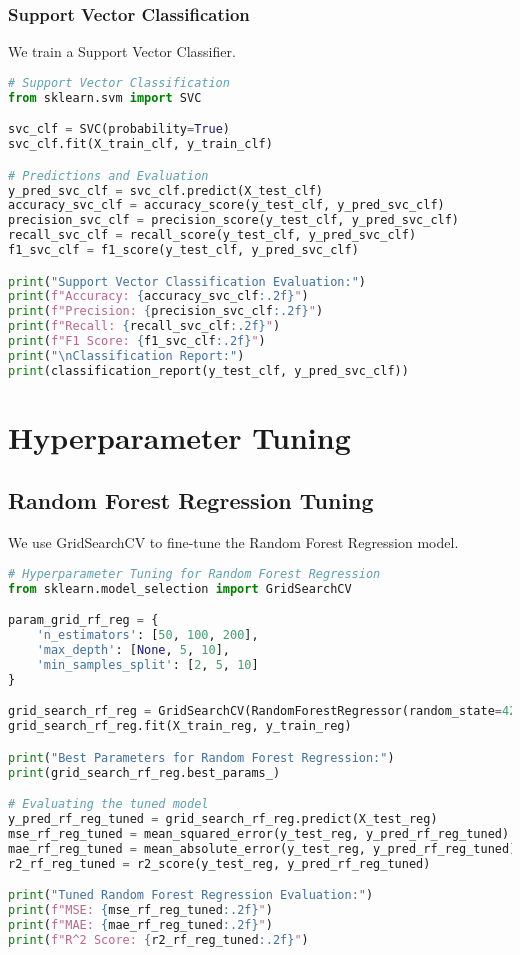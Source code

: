 \documentclass{article}
\begin{document}
\subsubsection{Support Vector Classification}

We train a Support Vector Classifier.

\begin{lstlisting}[language=Python]
# Support Vector Classification
from sklearn.svm import SVC

svc_clf = SVC(probability=True)
svc_clf.fit(X_train_clf, y_train_clf)

# Predictions and Evaluation
y_pred_svc_clf = svc_clf.predict(X_test_clf)
accuracy_svc_clf = accuracy_score(y_test_clf, y_pred_svc_clf)
precision_svc_clf = precision_score(y_test_clf, y_pred_svc_clf)
recall_svc_clf = recall_score(y_test_clf, y_pred_svc_clf)
f1_svc_clf = f1_score(y_test_clf, y_pred_svc_clf)

print("Support Vector Classification Evaluation:")
print(f"Accuracy: {accuracy_svc_clf:.2f}")
print(f"Precision: {precision_svc_clf:.2f}")
print(f"Recall: {recall_svc_clf:.2f}")
print(f"F1 Score: {f1_svc_clf:.2f}")
print("\nClassification Report:")
print(classification_report(y_test_clf, y_pred_svc_clf))
\end{lstlisting}

\section{Hyperparameter Tuning}

\subsection{Random Forest Regression Tuning}

We use GridSearchCV to fine-tune the Random Forest Regression model.

\begin{lstlisting}[language=Python]
# Hyperparameter Tuning for Random Forest Regression
from sklearn.model_selection import GridSearchCV

param_grid_rf_reg = {
    'n_estimators': [50, 100, 200],
    'max_depth': [None, 5, 10],
    'min_samples_split': [2, 5, 10]
}

grid_search_rf_reg = GridSearchCV(RandomForestRegressor(random_state=42), param_grid_rf_reg, cv=5)
grid_search_rf_reg.fit(X_train_reg, y_train_reg)

print("Best Parameters for Random Forest Regression:")
print(grid_search_rf_reg.best_params_)

# Evaluating the tuned model
y_pred_rf_reg_tuned = grid_search_rf_reg.predict(X_test_reg)
mse_rf_reg_tuned = mean_squared_error(y_test_reg, y_pred_rf_reg_tuned)
mae_rf_reg_tuned = mean_absolute_error(y_test_reg, y_pred_rf_reg_tuned)
r2_rf_reg_tuned = r2_score(y_test_reg, y_pred_rf_reg_tuned)

print("Tuned Random Forest Regression Evaluation:")
print(f"MSE: {mse_rf_reg_tuned:.2f}")
print(f"MAE: {mae_rf_reg_tuned:.2f}")
print(f"R^2 Score: {r2_rf_reg_tuned:.2f}")
\end{lstlisting}
\end{document}
